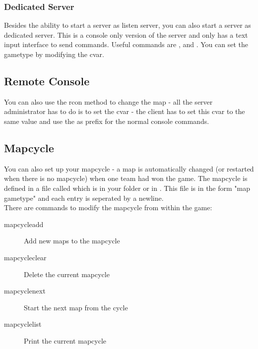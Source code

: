 \subsubsection{Dedicated Server}
Besides the ability to start a server as listen server, you can also start a server as dedicated server. This is a console only version of the server and only has a text input interface to send commands. Useful commands are ,  and . You can set the gametype by modifying the  cvar.

\subsection{Remote Console}
You can also use the rcon method to change the map - all the server administrator has to do is to set the cvar  - the client has to set this cvar to the same value and use the  as prefix for the normal console commands.

\subsection{Mapcycle}
You can also set up your mapcycle - a map is automatically changed (or restarted when there is no mapcycle) when one team had won the game. The mapcycle is defined in a file called  which is in your  folder or in . This file is in the form "map gametype" and each entry is seperated by a newline.\\
There are commands to modify the mapcycle from within the game:
\begin{description}
\item[mapcycleadd] Add new maps to the mapcycle
\item[mapcycleclear] Delete the current mapcycle
\item[mapcyclenext] Start the next map from the cycle
\item[mapcyclelist] Print the current mapcycle
\end{description}
